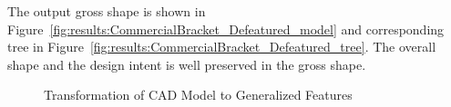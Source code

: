 

The output gross shape is shown in Figure~\ref{fig:results:CommercialBracket_Defeatured_model} and corresponding tree in Figure~\ref{fig:results:CommercialBracket_Defeatured_tree}. The overall shape and the design intent is well preserved in the gross shape.


\begin{figure}[!h]
\centering     %
{}\quad
{}
\caption{Transformation of CAD Model to Generalized Features}\label{fig:results:CommercialBracketable}
\end{figure}


